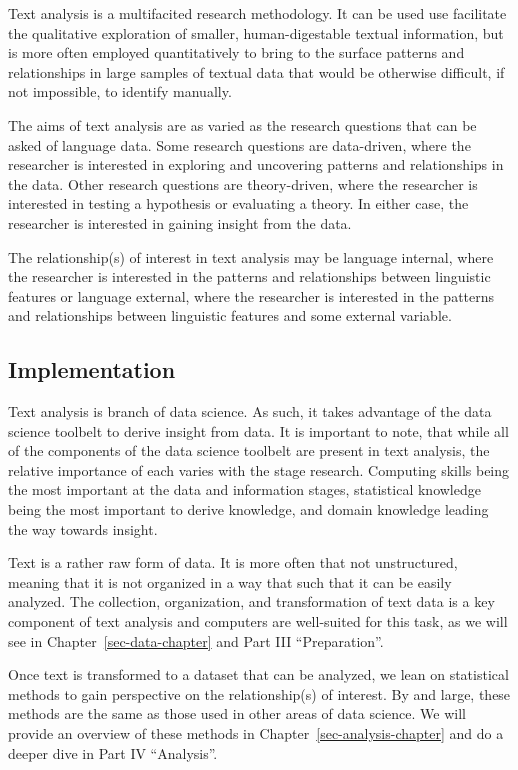 \documentclass[
  letterpaper,
]{latex/krantz}
\theoremstyle{definition}
\theoremstyle{remark}
\begin{document}
Text analysis is a multifacited research methodology. It can be used use
facilitate the qualitative exploration of smaller, human-digestable
textual information, but is more often employed quantitatively to bring
to the surface patterns and relationships in large samples of textual
data that would be otherwise difficult, if not impossible, to identify
manually.

The aims of text analysis are as varied as the research questions that
can be asked of language data. Some research questions are data-driven,
where the researcher is interested in exploring and uncovering patterns
and relationships in the data. Other research questions are
theory-driven, where the researcher is interested in testing a
hypothesis or evaluating a theory. In either case, the researcher is
interested in gaining insight from the data.

The relationship(s) of interest in text analysis may be language
internal, where the researcher is interested in the patterns and
relationships between linguistic features or language external, where
the researcher is interested in the patterns and relationships between
linguistic features and some external variable.

\subsection{Implementation}\label{implementation}

Text analysis is branch of data science. As such, it takes advantage of
the data science toolbelt to derive insight from data. It is important
to note, that while all of the components of the data science toolbelt
are present in text analysis, the relative importance of each varies
with the stage research. Computing skills being the most important at
the data and information stages, statistical knowledge being the most
important to derive knowledge, and domain knowledge leading the way
towards insight.

Text is a rather raw form of data. It is more often that not
unstructured, meaning that it is not organized in a way that such that
it can be easily analyzed. The collection, organization, and
transformation of text data is a key component of text analysis and
computers are well-suited for this task, as we will see in
Chapter~\ref{sec-data-chapter} and Part III ``Preparation''.

Once text is transformed to a dataset that can be analyzed, we lean on
statistical methods to gain perspective on the relationship(s) of
interest. By and large, these methods are the same as those used in
other areas of data science. We will provide an overview of these
methods in Chapter~\ref{sec-analysis-chapter} and do a deeper dive in
Part IV ``Analysis''.
\end{document}
